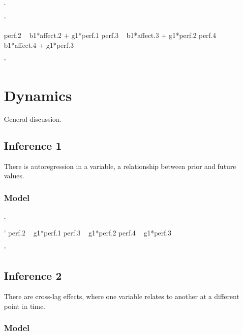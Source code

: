 \documentclass[english,,man]{apa6}
\newenvironment{Shaded}{\begin{snugshade}}{\end{snugshade}}
\newcommand{\StringTok}[1]{\textcolor[rgb]{0.31,0.60,0.02}{#1}}
\theoremstyle{definition}
\theoremstyle{definition}
\theoremstyle{definition}
\theoremstyle{remark}
\begin{document}
.

\begin{Shaded}
\begin{Highlighting}[]
\StringTok{'}

\StringTok{perf.2 ~ b1*affect.2 + g1*perf.1}
\StringTok{perf.3 ~ b1*affect.3 + g1*perf.2}
\StringTok{perf.4 ~ b1*affect.4 + g1*perf.3}

\StringTok{'}
\end{Highlighting}
\end{Shaded}

\hypertarget{dynamics}{%
\section{Dynamics}\label{dynamics}}

General discussion.

\hypertarget{inference-1-4}{%
\subsection{Inference 1}\label{inference-1-4}}

There is autoregression in a variable, a relationship between prior and
future values.

\hypertarget{model-9}{%
\subsubsection{Model}\label{model-9}}

.

\begin{Shaded}
\begin{Highlighting}[]
\StringTok{'}
\StringTok{perf.2 ~ g1*perf.1}
\StringTok{perf.3 ~ g1*perf.2}
\StringTok{perf.4 ~ g1*perf.3}

\StringTok{'}
\end{Highlighting}
\end{Shaded}

\hypertarget{inference-2-2}{%
\subsection{Inference 2}\label{inference-2-2}}

There are cross-lag effects, where one variable relates to another at a
different point in time.

\hypertarget{model-10}{%
\subsubsection{Model}\label{model-10}}
\end{document}

